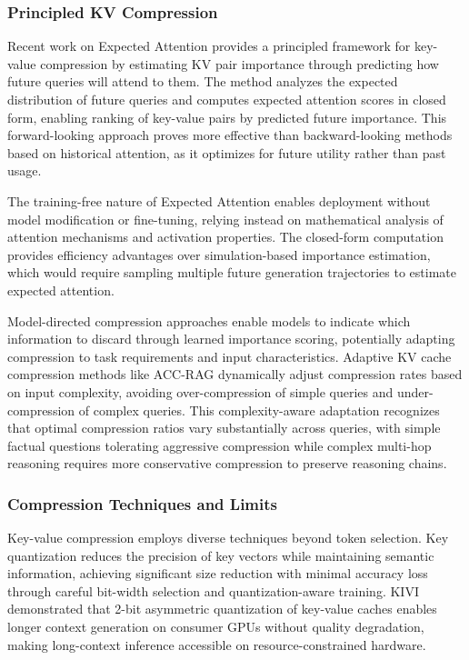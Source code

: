 \subsubsection{Principled KV Compression}

Recent work on Expected Attention \citep{zhang2025expected} provides a principled framework for key-value compression by estimating KV pair importance through predicting how future queries will attend to them. The method analyzes the expected distribution of future queries and computes expected attention scores in closed form, enabling ranking of key-value pairs by predicted future importance. This forward-looking approach proves more effective than backward-looking methods based on historical attention, as it optimizes for future utility rather than past usage.

The training-free nature of Expected Attention enables deployment without model modification or fine-tuning, relying instead on mathematical analysis of attention mechanisms and activation properties. The closed-form computation provides efficiency advantages over simulation-based importance estimation, which would require sampling multiple future generation trajectories to estimate expected attention.

Model-directed compression approaches enable models to indicate which information to discard through learned importance scoring, potentially adapting compression to task requirements and input characteristics. Adaptive KV cache compression methods like ACC-RAG dynamically adjust compression rates based on input complexity, avoiding over-compression of simple queries and under-compression of complex queries. This complexity-aware adaptation recognizes that optimal compression ratios vary substantially across queries, with simple factual questions tolerating aggressive compression while complex multi-hop reasoning requires more conservative compression to preserve reasoning chains.

\subsubsection{Compression Techniques and Limits}

Key-value compression employs diverse techniques beyond token selection. Key quantization reduces the precision of key vectors while maintaining semantic information, achieving significant size reduction with minimal accuracy loss through careful bit-width selection and quantization-aware training. KIVI demonstrated that 2-bit asymmetric quantization of key-value caches enables longer context generation on consumer GPUs without quality degradation, making long-context inference accessible on resource-constrained hardware.

